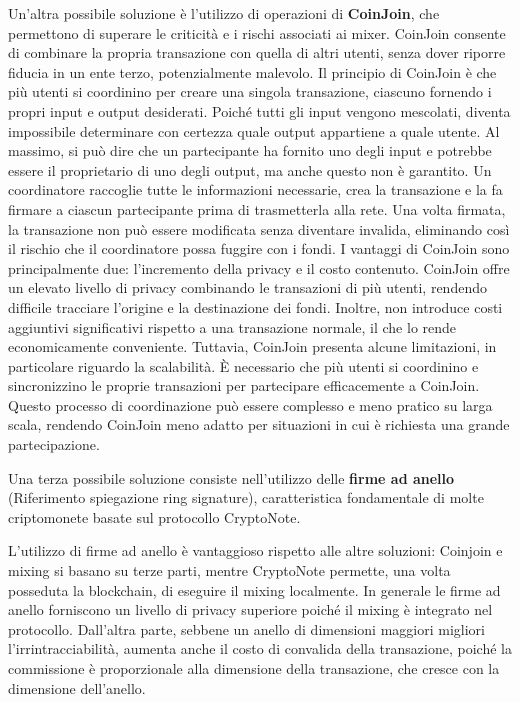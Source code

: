 Un'altra possibile soluzione è l'utilizzo di operazioni di \textbf{CoinJoin}, che permettono di superare le criticità e i rischi associati ai mixer. CoinJoin consente di combinare la propria transazione con quella di altri utenti, senza dover riporre fiducia in un ente terzo, potenzialmente malevolo. Il principio di CoinJoin è che più utenti si coordinino per creare una singola transazione, ciascuno fornendo i propri input e output desiderati. Poiché tutti gli input vengono mescolati, diventa impossibile determinare con certezza quale output appartiene a quale utente. Al massimo, si può dire che un partecipante ha fornito uno degli input e potrebbe essere il proprietario di uno degli output, ma anche questo non è garantito.
Un coordinatore raccoglie tutte le informazioni necessarie, crea la transazione e la fa firmare a ciascun partecipante prima di trasmetterla alla rete. Una volta firmata, la transazione non può essere modificata senza diventare invalida, eliminando così il rischio che il coordinatore possa fuggire con i fondi.
I vantaggi di CoinJoin sono principalmente due: l'incremento della privacy e il costo contenuto. CoinJoin offre un elevato livello di privacy combinando le transazioni di più utenti, rendendo difficile tracciare l'origine e la destinazione dei fondi. Inoltre, non introduce costi aggiuntivi significativi rispetto a una transazione normale, il che lo rende economicamente conveniente.
Tuttavia, CoinJoin presenta alcune limitazioni, in particolare riguardo la scalabilità. È necessario che più utenti si coordinino e sincronizzino le proprie transazioni per partecipare efficacemente a CoinJoin. Questo processo di coordinazione può essere complesso e meno pratico su larga scala, rendendo CoinJoin meno adatto per situazioni in cui è richiesta una grande partecipazione.

Una terza possibile soluzione consiste nell’utilizzo delle \textbf{firme ad anello} (Riferimento spiegazione ring signature), caratteristica fondamentale di molte criptomonete basate sul protocollo CryptoNote. 

L'utilizzo di firme ad anello è vantaggioso rispetto alle altre soluzioni: Coinjoin e mixing si basano su terze parti, mentre CryptoNote permette, una volta posseduta la blockchain, di eseguire il mixing localmente. In generale le firme ad anello forniscono un livello di privacy superiore poiché il mixing è integrato nel protocollo. Dall'altra parte, sebbene un anello di dimensioni maggiori migliori l'irrintracciabilità, aumenta anche il costo di convalida della transazione, poiché la commissione è proporzionale alla dimensione della transazione, che cresce con la dimensione dell'anello.

